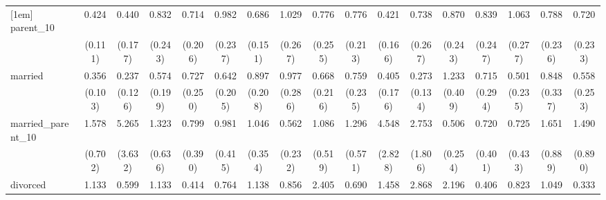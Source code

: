 {\begin{tabular}{l*{16}{c}}
[1em]
parent\_10           &       0.424\sym{**} &       0.440\sym{*}  &       0.832         &       0.714         &       0.982         &       0.686         &       1.029         &       0.776         &       0.776         &       0.421\sym{*}  &       0.738         &       0.870         &       0.839         &       1.063         &       0.788         &       0.720         \\
                    &     (0.111)         &     (0.177)         &     (0.243)         &     (0.206)         &     (0.237)         &     (0.151)         &     (0.267)         &     (0.255)         &     (0.213)         &     (0.166)         &     (0.267)         &     (0.243)         &     (0.247)         &     (0.277)         &     (0.236)         &     (0.233)         \\
[1em]
married             &       0.356\sym{***}&       0.237\sym{**} &       0.574         &       0.727         &       0.642         &       0.897         &       0.977         &       0.668         &       0.759         &       0.405\sym{*}  &       0.273\sym{**} &       1.233         &       0.715         &       0.501         &       0.848         &       0.558         \\
                    &     (0.103)         &     (0.126)         &     (0.199)         &     (0.250)         &     (0.205)         &     (0.208)         &     (0.286)         &     (0.216)         &     (0.235)         &     (0.176)         &     (0.134)         &     (0.409)         &     (0.294)         &     (0.235)         &     (0.337)         &     (0.253)         \\
[1em]
married\_parent\_10   &       1.578         &       5.265\sym{*}  &       1.323         &       0.799         &       0.981         &       1.046         &       0.562         &       1.086         &       1.296         &       4.548\sym{*}  &       2.753         &       0.506         &       0.720         &       0.725         &       1.651         &       1.490         \\
                    &     (0.702)         &     (3.632)         &     (0.636)         &     (0.390)         &     (0.415)         &     (0.354)         &     (0.232)         &     (0.519)         &     (0.571)         &     (2.828)         &     (1.806)         &     (0.254)         &     (0.401)         &     (0.433)         &     (0.889)         &     (0.890)         \\
[1em]
divorced            &       1.133         &       0.599         &       1.133         &       0.414         &       0.764         &       1.138         &       0.856         &       2.405\sym{*}  &       0.690         &       1.458         &       2.868\sym{*}  &       2.196         &       0.406         &       0.823         &       1.049         &       0.333         \\

\end{tabular}}
